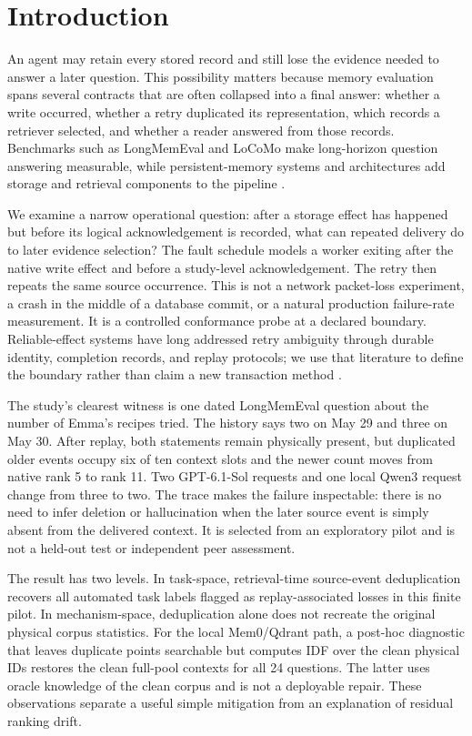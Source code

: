 \documentclass[10pt,letterpaper]{article}
\begin{document}
\section{Introduction}
An agent may retain every stored record and still lose the evidence needed to answer a later question. This possibility matters because memory evaluation spans several contracts that are often collapsed into a final answer: whether a write occurred, whether a retry duplicated its representation, which records a retriever selected, and whether a reader answered from those records. Benchmarks such as LongMemEval and LoCoMo make long-horizon question answering measurable, while persistent-memory systems and architectures add storage and retrieval components to the pipeline \citep{wu2024longmemeval,maharana2024evaluating,packer2023memgpt,chhikara2025mem,xu2025amem,rasmussen2025zep}.

We examine a narrow operational question: after a storage effect has happened but before its logical acknowledgement is recorded, what can repeated delivery do to later evidence selection? The fault schedule models a worker exiting after the native write effect and before a study-level acknowledgement. The retry then repeats the same source occurrence. This is not a network packet-loss experiment, a crash in the middle of a database commit, or a natural production failure-rate measurement. It is a controlled conformance probe at a declared boundary. Reliable-effect systems have long addressed retry ambiguity through durable identity, completion records, and replay protocols; we use that literature to define the boundary rather than claim a new transaction method \citep{lee2015implementing,zhang2020fault,birrell1984implementing,fielding2022http}.

The study's clearest witness is one dated LongMemEval question about the number of Emma's recipes tried. The history says two on May 29 and three on May 30. After replay, both statements remain physically present, but duplicated older events occupy six of ten context slots and the newer count moves from native rank 5 to rank 11. Two GPT-6.1-Sol requests and one local Qwen3 request change from three to two. The trace makes the failure inspectable: there is no need to infer deletion or hallucination when the later source event is simply absent from the delivered context. It is selected from an exploratory pilot and is not a held-out test or independent peer assessment.

The result has two levels. In task-space, retrieval-time source-event deduplication recovers all automated task labels flagged as replay-associated losses in this finite pilot. In mechanism-space, deduplication alone does not recreate the original physical corpus statistics. For the local Mem0/Qdrant path, a post-hoc diagnostic that leaves duplicate points searchable but computes IDF over the clean physical IDs restores the clean full-pool contexts for all 24 questions. The latter uses oracle knowledge of the clean corpus and is not a deployable repair. These observations separate a useful simple mitigation from an explanation of residual ranking drift.
\end{document}
